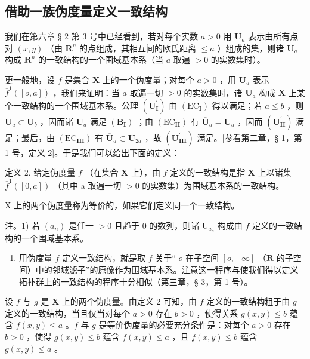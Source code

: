 \subsection{借助一族伪度量定义一致结构}

我们在第六章 § 2 第 3 号中已经看到，若对每个实数 \(a > 0\) 用 \(\mathbf{U}_a\) 表示由所有点对 \((x, y)\) （由 \(\mathbf{R}^n\) 的点组成，其相互间的欧氏距离 \(\leqslant a\) ）组成的集，则诸 \(\mathbf{U}_a\) 构成 \(\mathbf{R}^n\) 的一致结构的一个围域基本系（当 \(a\) 取遍 \(> 0\) 的实数集时）。

更一般地，设 \(f\) 是集合 \(\mathbf{X}\) 上的一个伪度量；对每个 \(a > 0\) ，用 \(\mathbf{U}_a\) 表示 \(\overline{f}^{1}([o, a])\) ，我们来证明：当 \(a\) 取遍一切 \(> 0\) 的实数集时，诸 \(\mathbf{U}_a\) 构成 \(\mathbf{X}\) 上某个一致结构的一个围域基本系。公理 \((\mathbf{U}_{\mathbf{I}}^{\prime})\) 由 \((\mathrm{EC}_{\mathbf{I}})\) 得以满足；若 \(a \leqslant b\) ，则 \(\mathbf{U}_a \subset \mathbf{U}_b\) ，因而诸 \(\mathbf{U}_a\) 满足 \((\mathbf{B}_{\mathbf{I}})\) ；由 \((\mathrm{EC}_{\mathbf{II}})\) 有 \(\overline{\mathbf{U}}_a = \mathbf{U}_a\) ，因而 \((\mathbf{U}_{\mathbf{II}}^{\prime})\) 满足；最后，由 \((\mathrm{EC}_{\mathbf{III}})\) 有 \(\overline{\mathbf{U}}_a \subset \mathbf{U}_{2a}\) ，故 \((\mathbf{U}_{\mathbf{III}}^{\prime})\) 满足。{[}参看第二章，§ 1，第 1 号，定义 2{]}。于是我们可以给出下面的定义：

定义 2. 给定伪度量 \(f\) （在集合 \(\mathbf{X}\) 上），由 \(f\) 定义的一致结构是指 \(\mathbf{X}\) 上以诸集 \(\overline{f}^{1}([0, a])\) （其中 a 取遍一切 \(> 0\) 的实数集）为围域基本系的一致结构。

X 上的两个伪度量称为等价的，如果它们定义同一个一致结构。

注。1) 若 \((a_{n})\) 是任一 \(>0\) 且趋于 \(0\) 的数列，则诸 \(\mathrm{U}_{a_n}\) 构成由 \(f\) 定义的一致结构的一个围域基本系。

\begin{enumerate}
\def\labelenumi{\arabic{enumi})}
\setcounter{enumi}{1}
\tightlist
\item
  用伪度量 \(f\) 定义一致结构，就是取 \(f\) 关于“ \(o\) 在子空间 \([o, +\infty]\) （\(\overline{\mathbf{R}}\) 的子空间）中的邻域滤子”的原像作为围域基本系。注意这一程序与使我们得以定义拓扑群上的一致结构的程序十分相似（第三章，§ 3，第 1 号）。
\end{enumerate}

设 \(f\) 与 \(g\) 是 \(\mathbf{X}\) 上的两个伪度量。由定义 2 可知，由 \(f\) 定义的一致结构粗于由 \(g\) 定义的一致结构，当且仅当对每个 \(a > 0\) 存在 \(b > 0\) ，使得关系 \(g(x, y) \leqslant b\) 蕴含 \(f(x, y) \leqslant a\) 。\(f\) 与 \(g\) 是等价伪度量的必要充分条件是：对每个 \(a > 0\) 存在 \(b > 0\) ，使得 \(g(x, y) \leqslant b\) 蕴含 \(f(x, y) \leqslant a\) ，且 \(f(x, y) \leqslant b\) 蕴含 \(g(x, y) \leqslant a\) 。

